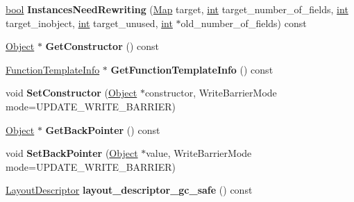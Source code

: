\begin{DoxyCompactItemize}
\item 
\mbox{\label{classv8_1_1internal_1_1Map_a53670b82ff29b7c9fc906f84b99ea083}} 
\mbox{\hyperlink{classbool}{bool}} {\bfseries Instances\+Need\+Rewriting} (\mbox{\hyperlink{classv8_1_1internal_1_1Map}{Map}} target, \mbox{\hyperlink{classint}{int}} target\+\_\+number\+\_\+of\+\_\+fields, \mbox{\hyperlink{classint}{int}} target\+\_\+inobject, \mbox{\hyperlink{classint}{int}} target\+\_\+unused, \mbox{\hyperlink{classint}{int}} $\ast$old\+\_\+number\+\_\+of\+\_\+fields) const
\item 
\mbox{\label{classv8_1_1internal_1_1Map_a3099b009765049ccb7a115c0d433cfa0}} 
\mbox{\hyperlink{classv8_1_1internal_1_1Object}{Object}} $\ast$ {\bfseries Get\+Constructor} () const
\item 
\mbox{\label{classv8_1_1internal_1_1Map_a0fb7ce891019328393a51bd6e270c8f9}} 
\mbox{\hyperlink{classv8_1_1internal_1_1FunctionTemplateInfo}{Function\+Template\+Info}} $\ast$ {\bfseries Get\+Function\+Template\+Info} () const
\item 
\mbox{\label{classv8_1_1internal_1_1Map_a0f9146d3c513e8c37763c89dd86ff71f}} 
void {\bfseries Set\+Constructor} (\mbox{\hyperlink{classv8_1_1internal_1_1Object}{Object}} $\ast$constructor, Write\+Barrier\+Mode mode=U\+P\+D\+A\+T\+E\+\_\+\+W\+R\+I\+T\+E\+\_\+\+B\+A\+R\+R\+I\+ER)
\item 
\mbox{\label{classv8_1_1internal_1_1Map_a1888fd854f64928ced5498a80caf3818}} 
\mbox{\hyperlink{classv8_1_1internal_1_1Object}{Object}} $\ast$ {\bfseries Get\+Back\+Pointer} () const
\item 
\mbox{\label{classv8_1_1internal_1_1Map_a50e304739b2086469cde853b8f50c6dd}} 
void {\bfseries Set\+Back\+Pointer} (\mbox{\hyperlink{classv8_1_1internal_1_1Object}{Object}} $\ast$value, Write\+Barrier\+Mode mode=U\+P\+D\+A\+T\+E\+\_\+\+W\+R\+I\+T\+E\+\_\+\+B\+A\+R\+R\+I\+ER)
\item 
\mbox{\label{classv8_1_1internal_1_1Map_a9cd7b1fac0b5619458bae34b78c6ae07}} 
\mbox{\hyperlink{classv8_1_1internal_1_1LayoutDescriptor}{Layout\+Descriptor}} {\bfseries layout\+\_\+descriptor\+\_\+gc\+\_\+safe} () const

\end{DoxyCompactItemize}
